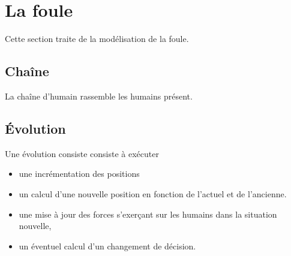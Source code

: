 %
\section{La foule}
%
Cette section traite de la modélisation de la foule.
%
\subsection{Chaîne}
La chaîne d'humain rassemble les humains présent.
%
\subsection{Évolution}
Une évolution consiste consiste à exécuter
\begin{itemize}[leftmargin=1cm, label=, itemsep=0pt]%
\item  une incrémentation des positions
\item  un calcul d'une nouvelle position en fonction de l'actuel et de l'ancienne.
\item  une mise à jour des forces s'exerçant sur les humains dans la situation nouvelle,
\item  un éventuel calcul d'un changement de décision.
\end{itemize}
%
